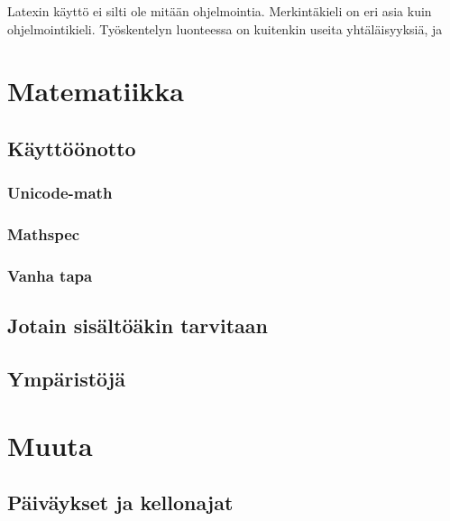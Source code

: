 \documentclass[notitlepage,oneside]{book}
\begin{document}
Latexin käyttö ei silti ole mitään ohjelmointia. Merkintäkieli on eri
asia kuin ohjelmointikieli. Työskentelyn luonteessa on kuitenkin useita
yhtäläisyyksiä, ja 





\chapter{Matematiikka}
\label{luku:matematiikka}
\section{Käyttöönotto}
\subsection{Unicode-math}
\subsection{Mathspec}
\subsection{Vanha tapa}
\section{Jotain sisältöäkin tarvitaan}
\section{Ympäristöjä}

\chapter{Muuta}
\section{Päiväykset ja kellonajat}

\printindex
\end{document}
